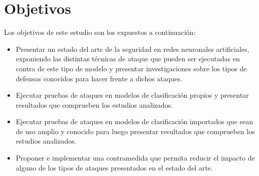 \section{Objetivos}

Los objetivos de este estudio son los expuestos a continuación:
\begin{itemize}
\item Presentar un estado del arte de la seguridad en redes neuronales artificiales, exponiendo las distintas técnicas de ataque que pueden ser ejecutadas en contra de este tipo de modelo y presentar investigaciones sobre los tipos de defensas conocidos para hacer frente a dichos ataques.
\item Ejecutar pruebas de ataques en modelos de clasificación propios y presentar resultados que comprueben los estudios analizados.
\item Ejecutar pruebas de ataques en modelos de clasificación importados que sean de uso amplio y conocido para luego presentar resultados que comprueben los estudios analizados.
\item Proponer e implementar una contramedida que permita reducir el impacto de alguno de los tipos de ataques presentados en el estado del arte.
\end{itemize}

